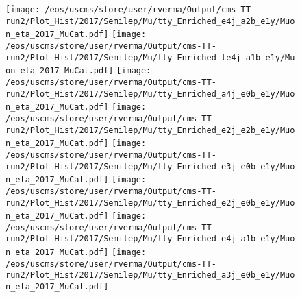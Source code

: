 \begin{figure}
\centering
\texttt{[image: /eos/uscms/store/user/rverma/Output/cms-TT-run2/Plot\_Hist/2017/Semilep/Mu/tty\_Enriched\_e4j\_a2b\_e1y/Muon\_eta\_2017\_MuCat.pdf]}
\texttt{[image: /eos/uscms/store/user/rverma/Output/cms-TT-run2/Plot\_Hist/2017/Semilep/Mu/tty\_Enriched\_le4j\_a1b\_e1y/Muon\_eta\_2017\_MuCat.pdf]}
\texttt{[image: /eos/uscms/store/user/rverma/Output/cms-TT-run2/Plot\_Hist/2017/Semilep/Mu/tty\_Enriched\_a4j\_e0b\_e1y/Muon\_eta\_2017\_MuCat.pdf]}
\texttt{[image: /eos/uscms/store/user/rverma/Output/cms-TT-run2/Plot\_Hist/2017/Semilep/Mu/tty\_Enriched\_e2j\_e2b\_e1y/Muon\_eta\_2017\_MuCat.pdf]}
\texttt{[image: /eos/uscms/store/user/rverma/Output/cms-TT-run2/Plot\_Hist/2017/Semilep/Mu/tty\_Enriched\_e3j\_e0b\_e1y/Muon\_eta\_2017\_MuCat.pdf]}
\texttt{[image: /eos/uscms/store/user/rverma/Output/cms-TT-run2/Plot\_Hist/2017/Semilep/Mu/tty\_Enriched\_e2j\_e0b\_e1y/Muon\_eta\_2017\_MuCat.pdf]}
\texttt{[image: /eos/uscms/store/user/rverma/Output/cms-TT-run2/Plot\_Hist/2017/Semilep/Mu/tty\_Enriched\_e4j\_a1b\_e1y/Muon\_eta\_2017\_MuCat.pdf]}
\texttt{[image: /eos/uscms/store/user/rverma/Output/cms-TT-run2/Plot\_Hist/2017/Semilep/Mu/tty\_Enriched\_a3j\_e0b\_e1y/Muon\_eta\_2017\_MuCat.pdf]}
\end{figure}

